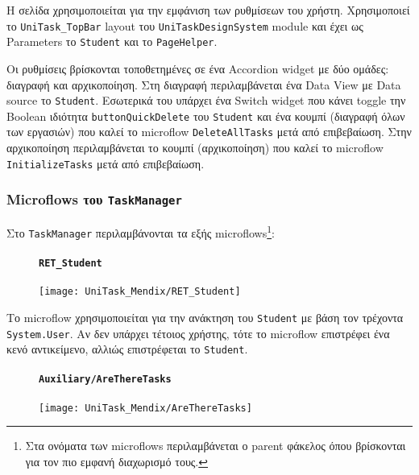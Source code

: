                 Η σελίδα χρησιμοποιείται για την εμφάνιση των ρυθμίσεων του χρήστη. Χρησιμοποιεί το \texttt{UniTask\_TopBar} layout του \texttt{UniTaskDesignSystem} module και έχει ως Parameters το \texttt{Student} και το \texttt{PageHelper}.

                Οι ρυθμίσεις βρίσκονται τοποθετημένες σε ένα Accordion widget με δύο ομάδες: διαγραφή και αρχικοποίηση. Στη διαγραφή περιλαμβάνεται ένα Data View με Data source το \texttt{Student}. Εσωτερικά του υπάρχει ένα Switch widget που κάνει toggle την Boolean ιδιότητα \texttt{buttonQuickDelete} του \texttt{Student} και ένα κουμπί ({\Zona διαγραφή όλων των εργασιών}) που καλεί το microflow \texttt{DeleteAllTasks} μετά από επιβεβαίωση. Στην αρχικοποίηση περιλαμβάνεται το κουμπί ({\Zona αρχικοποίηση}) που καλεί το microflow \texttt{InitializeTasks} μετά από επιβεβαίωση.

            \subsubsection{Microflows του \texttt{TaskManager}}
                Στο \texttt{TaskManager} περιλαμβάνονται τα εξής microflows\footnote{Στα ονόματα των microflows περιλαμβάνεται ο parent φάκελος όπου βρίσκονται για τον πιο εμφανή διαχωρισμό τους.}:

                \begin{figure}[H] \noindent
                    \paragraph{\texttt{RET\_Student}}
                    \begin{center}
                        \texttt{[image: UniTask\_Mendix/RET\_Student]}
                    \end{center}
                \end{figure}

                Το microflow χρησιμοποιείται για την ανάκτηση του \texttt{Student} με βάση τον τρέχοντα \texttt{System.User}. Αν δεν υπάρχει τέτοιος χρήστης, τότε το microflow επιστρέφει ένα κενό αντικείμενο, αλλιώς επιστρέφεται το \texttt{Student}.

                \begin{figure}[H] \noindent
                    \paragraph{\texttt{Auxiliary/AreThereTasks}}
                    \begin{center}
                        \texttt{[image: UniTask\_Mendix/AreThereTasks]}
                    \end{center}
                \end{figure}

